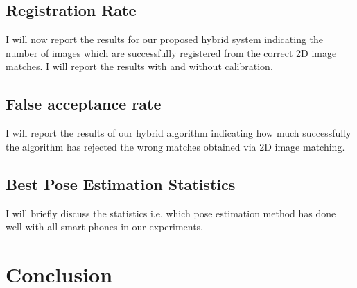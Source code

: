 \subsection{Registration Rate}
I will now report the results for our proposed 
hybrid system indicating the number of images 
which are successfully registered from the correct 2D image 
matches. I will report the results with and without 
calibration. 

\subsection{False acceptance rate}
I will report the results of our hybrid algorithm 
indicating how much successfully the 
algorithm has rejected the wrong matches 
obtained via 2D image matching.

\subsection{Best Pose Estimation Statistics}
I will briefly discuss the statistics 
i.e. which pose estimation method has 
done well with all smart phones in our experiments.
  
\section{Conclusion}